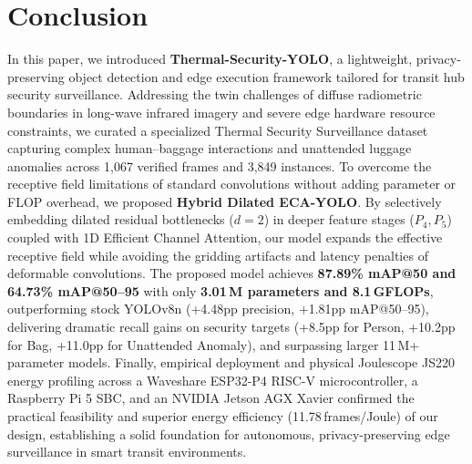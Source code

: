\documentclass[journal,twoside,web]{ieeecolor}
\begin{document}
\section{Conclusion}
\label{sec:conclusion}
In this paper, we introduced \textbf{Thermal-Security-YOLO}, a lightweight, privacy-preserving object detection and edge execution framework tailored for transit hub security surveillance. Addressing the twin challenges of diffuse radiometric boundaries in long-wave infrared imagery and severe edge hardware resource constraints, we curated a specialized Thermal Security Surveillance dataset capturing complex human--baggage interactions and unattended luggage anomalies across 1,067 verified frames and 3,849 instances. To overcome the receptive field limitations of standard convolutions without adding parameter or FLOP overhead, we proposed \textbf{Hybrid Dilated ECA-YOLO}. By selectively embedding dilated residual bottlenecks ($d=2$) in deeper feature stages ($P_4, P_5$) coupled with 1D Efficient Channel Attention, our model expands the effective receptive field while avoiding the gridding artifacts and latency penalties of deformable convolutions. The proposed model achieves \textbf{87.89\% mAP@50 and 64.73\% mAP@50--95} with only \textbf{3.01\,M parameters and 8.1\,GFLOPs}, outperforming stock YOLOv8n (+4.48pp precision, +1.81pp mAP@50--95), delivering dramatic recall gains on security targets (+8.5pp for Person, +10.2pp for Bag, +11.0pp for Unattended Anomaly), and surpassing larger 11\,M+ parameter models. Finally, empirical deployment and physical Joulescope JS220 energy profiling across a Waveshare ESP32-P4 RISC-V microcontroller, a Raspberry Pi 5 SBC, and an NVIDIA Jetson AGX Xavier confirmed the practical feasibility and superior energy efficiency (11.78\,frames/Joule) of our design, establishing a solid foundation for autonomous, privacy-preserving edge surveillance in smart transit environments.



\end{document}
